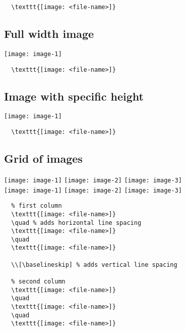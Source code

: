 \begin{lstlisting}
  \texttt{[image: <file-name>]}
\end{lstlisting}

\clearpage
\subsection{Full width image}

\texttt{[image: image-1]}

\begin{lstlisting}
  \texttt{[image: <file-name>]}
\end{lstlisting}

\clearpage
\subsection{Image with specific height}

\texttt{[image: image-1]}

\begin{lstlisting}
  \texttt{[image: <file-name>]}
\end{lstlisting}

\clearpage
\subsection{Grid of images}

\texttt{[image: image-1]}
\quad
\texttt{[image: image-2]}
\quad
\texttt{[image: image-3]}
\\[\baselineskip]%
\texttt{[image: image-1]}
\quad
\texttt{[image: image-2]}
\quad
\texttt{[image: image-3]}

\begin{lstlisting}
  % first column
  \texttt{[image: <file-name>]}
  \quad % adds horizontal line spacing
  \texttt{[image: <file-name>]}
  \quad
  \texttt{[image: <file-name>]}

  \\[\baselineskip] % adds vertical line spacing

  % second column
  \texttt{[image: <file-name>]}
  \quad
  \texttt{[image: <file-name>]}
  \quad
  \texttt{[image: <file-name>]}
\end{lstlisting}

